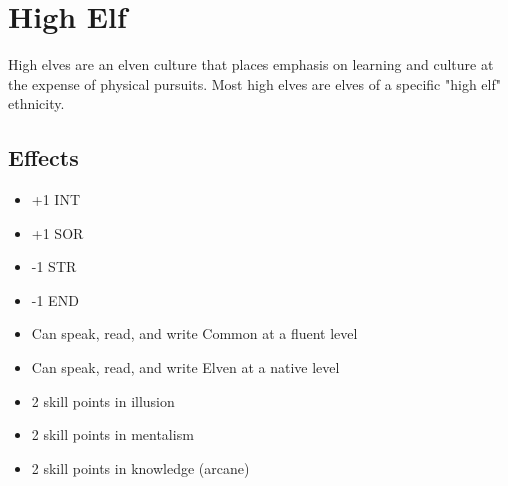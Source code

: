 \section{High Elf}\label{culture:high-elf}
High elves are an elven culture that places emphasis on learning and culture
at the expense of physical pursuits. Most high elves are elves of a specific
"high elf" ethnicity.

\subsection*{Effects}
\begin{itemize}
    \item +1 INT
    \item +1 SOR
    \item -1 STR
    \item -1 END
    \item Can speak, read, and write Common at a fluent level
    \item Can speak, read, and write Elven at a native level
    \item 2 skill points in illusion
    \item 2 skill points in mentalism
    \item 2 skill points in knowledge (arcane)
\end{itemize}
